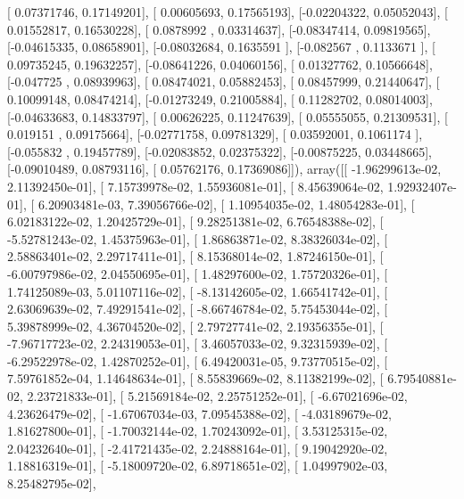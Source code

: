 \documentclass{article}
\begin{document}
       [ 0.07371746,  0.17149201],
       [ 0.00605693,  0.17565193],
       [-0.02204322,  0.05052043],
       [ 0.01552817,  0.16530228],
       [ 0.0878992 ,  0.03314637],
       [-0.08347414,  0.09819565],
       [-0.04615335,  0.08658901],
       [-0.08032684,  0.1635591 ],
       [-0.082567  ,  0.1133671 ],
       [ 0.09735245,  0.19632257],
       [-0.08641226,  0.04060156],
       [ 0.01327762,  0.10566648],
       [-0.047725  ,  0.08939963],
       [ 0.08474021,  0.05882453],
       [ 0.08457999,  0.21440647],
       [ 0.10099148,  0.08474214],
       [-0.01273249,  0.21005884],
       [ 0.11282702,  0.08014003],
       [-0.04633683,  0.14833797],
       [ 0.00626225,  0.11247639],
       [ 0.05555055,  0.21309531],
       [ 0.019151  ,  0.09175664],
       [-0.02771758,  0.09781329],
       [ 0.03592001,  0.1061174 ],
       [-0.055832  ,  0.19457789],
       [-0.02083852,  0.02375322],
       [-0.00875225,  0.03448665],
       [-0.09010489,  0.08793116],
       [ 0.05762176,  0.17369086]]), array([[ -1.96299613e-02,   2.11392450e-01],
       [  7.15739978e-02,   1.55936081e-01],
       [  8.45639064e-02,   1.92932407e-01],
       [  6.20903481e-03,   7.39056766e-02],
       [  1.10954035e-02,   1.48054283e-01],
       [  6.02183122e-02,   1.20425729e-01],
       [  9.28251381e-02,   6.76548388e-02],
       [ -5.52781243e-02,   1.45375963e-01],
       [  1.86863871e-02,   8.38326034e-02],
       [  2.58863401e-02,   2.29717411e-01],
       [  8.15368014e-02,   1.87246150e-01],
       [ -6.00797986e-02,   2.04550695e-01],
       [  1.48297600e-02,   1.75720326e-01],
       [  1.74125089e-03,   5.01107116e-02],
       [ -8.13142605e-02,   1.66541742e-01],
       [  2.63069639e-02,   7.49291541e-02],
       [ -8.66746784e-02,   5.75453044e-02],
       [  5.39878999e-02,   4.36704520e-02],
       [  2.79727741e-02,   2.19356355e-01],
       [ -7.96717723e-02,   2.24319053e-01],
       [  3.46057033e-02,   9.32315939e-02],
       [ -6.29522978e-02,   1.42870252e-01],
       [  6.49420031e-05,   9.73770515e-02],
       [  7.59761852e-04,   1.14648634e-01],
       [  8.55839669e-02,   8.11382199e-02],
       [  6.79540881e-02,   2.23721833e-01],
       [  5.21569184e-02,   2.25751252e-01],
       [ -6.67021696e-02,   4.23626479e-02],
       [ -1.67067034e-03,   7.09545388e-02],
       [ -4.03189679e-02,   1.81627800e-01],
       [ -1.70032144e-02,   1.70243092e-01],
       [  3.53125315e-02,   2.04232640e-01],
       [ -2.41721435e-02,   2.24888164e-01],
       [  9.19042920e-02,   1.18816319e-01],
       [ -5.18009720e-02,   6.89718651e-02],
       [  1.04997902e-03,   8.25482795e-02],
\end{document}
